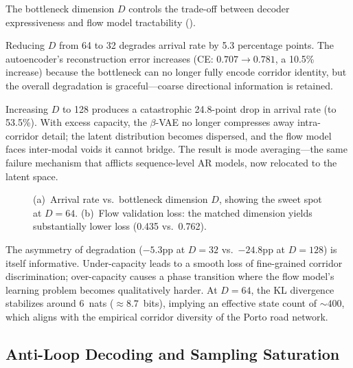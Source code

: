 The bottleneck dimension $D$ controls the trade-off between decoder expressiveness and flow model tractability ().

Reducing $D$ from 64 to 32 degrades arrival rate by 5.3 percentage points.
The autoencoder's reconstruction error increases (CE: $0.707 \to 0.781$, a 10.5\% increase) because the bottleneck can no longer fully encode corridor identity, but the overall degradation is graceful---coarse directional information is retained.

Increasing $D$ to 128 produces a catastrophic 24.8-point drop in arrival rate (to 53.5\%).
With excess capacity, the $\beta$-VAE no longer compresses away intra-corridor detail; the latent distribution becomes dispersed, and the flow model faces inter-modal voids it cannot bridge.
The result is mode averaging---the same failure mechanism that afflicts sequence-level AR models, now relocated to the latent space.

\begin{figure}[t]
  \centering
  \caption{(a)~Arrival rate vs.\ bottleneck dimension $D$, showing the sweet spot at $D\!=\!64$. (b)~Flow validation loss: the matched dimension yields substantially lower loss (0.435 vs.\ 0.762).}
  \label{fig:dim-ablation}
\end{figure}

The asymmetry of degradation ($-5.3$pp at $D\!=\!32$ vs.\ $-24.8$pp at $D\!=\!128$) is itself informative.
Under-capacity leads to a smooth loss of fine-grained corridor discrimination; over-capacity causes a phase transition where the flow model's learning problem becomes qualitatively harder.
At $D\!=\!64$, the KL divergence stabilizes around 6~nats ($\approx\!8.7$~bits), implying an effective state count of $\sim\!400$, which aligns with the empirical corridor diversity of the Porto road network.

\subsection{Anti-Loop Decoding and Sampling Saturation}
\label{sec:ablation-antiloop}

